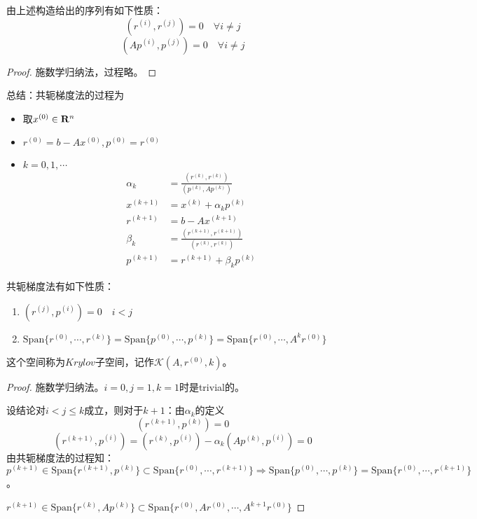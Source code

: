 \documentclass{ctexart}
\begin{document}
\begin{Thm}
由上述构造给出的序列有如下性质：
\[(r^{(i)},r^{(j)})=0\quad \forall i\neq j\]
\[(Ap^{(i)},p^{(j)})=0\quad\forall i\neq j\]
\end{Thm}
\begin{proof}
施数学归纳法，过程略。
\end{proof}

总结：共轭梯度法的过程为
\begin{itemize}
\item 取$x^{(0)}\in \mathbf{R}^n$
\item $r^{(0)}=b-Ax^{(0)},p^{(0)}=r^{(0)}$
\item $k=0,1,\cdots$
\begin{align*}
\alpha_k&=\frac{(r^{(k)},r^{(k)})}{(p^{(k)},Ap^{(k)})}\\
x^{(k+1)}&=x^{(k)}+\alpha_kp^{(k)}\\
r^{(k+1)}&=b-Ax^{(k+1)}\\
\beta_k&=\frac{(r^{(k+1)},r^{(k+1)})}{(r^{(k)},r^{(k)})}\\
p^{(k+1)}&=r^{(k+1)}+\beta_kp^{(k)}
\end{align*}
\end{itemize}

\begin{Lemma}
共轭梯度法有如下性质：
\begin{enumerate}
\item $(r^{(j)},p^{(i)})=0\quad i<j$
\item $\mathrm{Span}\{r^{(0)},\cdots,r^{(k)}\}=\mathrm{Span}\{p^{(0)},\cdots,p^{(k)}\}=\mathrm{Span}\{r^{(0)},\cdots, A^kr^{(0)}\}$
\end{enumerate}
\end{Lemma}

这个空间称为$Krylov$子空间，记作$\mathcal{K}(A,r^{(0)},k)$。

\begin{proof}
施数学归纳法。$i=0,j=1,k=1$时是trivial的。

设结论对$i<j\leq k$成立，则对于$k+1$：由$\alpha_k$的定义
\[(r^{(k+1)},p^{(k)})=0\]
\[(r^{(k+1)},p^{(i)})=(r^{(k)},p^{(i)})-\alpha_k(Ap^{(k)},p^{(i)})=0\]
由共轭梯度法的过程知：
$p^{(k+1)}\in\mathrm{Span}\{r^{(k+1)},p^{(k)}\}\subset \mathrm{Span}\{r^{(0)},\cdots,r^{(k+1)}\}\Rightarrow \mathrm{Span}\{p^{(0)},\cdots,p^{(k)}\}=\mathrm{Span}\{r^{(0)},\cdots,r^{(k+1)}\}$。

$r^{(k+1)}\in\mathrm{Span}\{r^{(k)},Ap^{(k)}\}\subset \mathrm{Span}\{r^{(0)},Ar^{(0)},\cdots,A^{k+1}r^{(0)}\}$
\end{proof}
\end{document}
